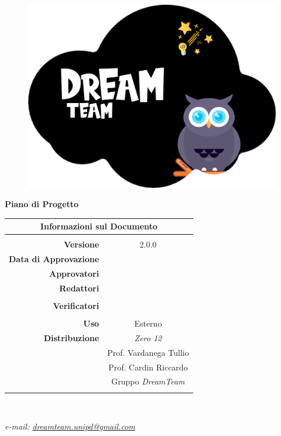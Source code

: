 
\begin{center}

\begin{figure}
\centering
\includegraphics[scale=0.05]{Sezioni/images/DreamTeam.png} 
\end{figure}

{\Huge{\textbf{Piano di Progetto}}} \\ [1cm]

\begin{table}[htbp]
\centering
\begin{tabular}{r|c}
\multicolumn{2}{c}{\textbf{Informazioni sul Documento}} \\
\hline \\
\textbf{Versione} & 2.0.0 \\ \rule{0pt}{3ex}    
\textbf{Data di Approvazione} &  \\ \rule{0pt}{3ex}    
\textbf{Approvatori} & \GC{} \\ \rule{0pt}{3ex}      
\textbf{Redattori} & \MB{} \\ \rule{0pt}{2ex}   
& \EP{} \\ \rule{0pt}{3ex}    
\textbf{Verificatori} & \FP{} \\ \rule{0pt}{2ex}   
& \MG{} \\ \rule{0pt}{3ex}      
\textbf{Uso} & Esterno \\ \rule{0pt}{3ex}    
\textbf{Distribuzione} & \textit{Zero 12} \\ \rule{0pt}{2ex} 
& Prof. Vardanega Tullio \\ \rule{0pt}{2ex}   
& Prof. Cardin Riccardo \\ \rule{0pt}{2ex}   
& Gruppo \textit{DreamTeam} \\ \rule{0pt}{0.1cm}   
\end{tabular} \\ [0.5cm]
\end{table}

\textsl{ e-mail: \href{mailto:dreamteam.unipd@gmail.com}{dreamteam.unipd@gmail.com} } \\[2cm]
\end{center}
\pagebreak